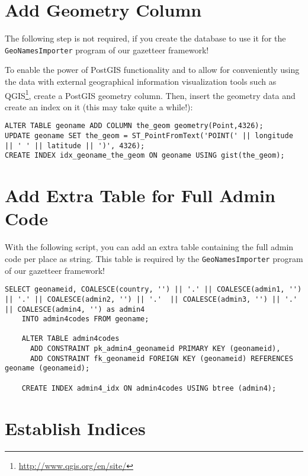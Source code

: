 \documentclass[fontsize=12pt, BCOR=10mm, DIV=14, parskip=true,headings=small]{scrartcl}
\begin{document}
\section{Add Geometry Column}
The following step is not required, if you create the database to use it for the \texttt{GeoNamesImporter} program of our gazetteer framework!

To enable the power of PostGIS functionality and to allow for conveniently using the data with external geographical information visualization tools such as QGIS\footnote{\url{ http://www.qgis.org/en/site/}}, create a PostGIS geometry column. Then, insert the geometry data and create an index on it (this may take quite a while!):
\begin{lstlisting}[breaklines]
ALTER TABLE geoname ADD COLUMN the_geom geometry(Point,4326);
UPDATE geoname SET the_geom = ST_PointFromText('POINT(' || longitude || ' ' || latitude || ')', 4326);
CREATE INDEX idx_geoname_the_geom ON geoname USING gist(the_geom);
\end{lstlisting}

\section{Add Extra Table for Full Admin Code}
With the following script, you can add an extra table containing the full admin code per place as string. This table is required by the \texttt{GeoNamesImporter} program of our gazetteer framework!

\begin{lstlisting}[breaklines]
    SELECT geonameid, COALESCE(country, '') || '.' || COALESCE(admin1, '') || '.' || COALESCE(admin2, '') || '.'  || COALESCE(admin3, '') || '.'  || COALESCE(admin4, '') as admin4
    INTO admin4codes FROM geoname;
    
    ALTER TABLE admin4codes
      ADD CONSTRAINT pk_admin4_geonameid PRIMARY KEY (geonameid),
      ADD CONSTRAINT fk_geonameid FOREIGN KEY (geonameid) REFERENCES geoname (geonameid);
    
    CREATE INDEX admin4_idx ON admin4codes USING btree (admin4);
\end{lstlisting}

\section{Establish Indices}
\end{document}
